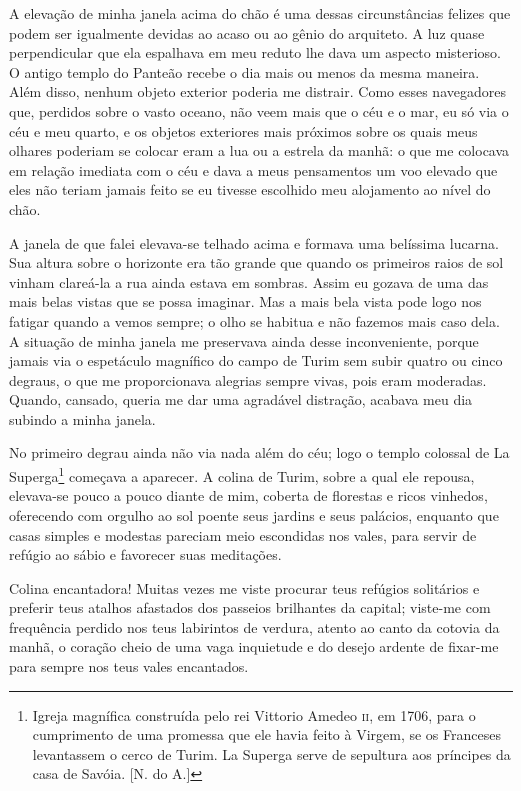  A elevação de minha janela acima do chão é uma dessas circunstâncias
felizes que podem ser igualmente devidas ao acaso ou ao gênio do
arquiteto. A luz quase perpendicular que ela espalhava em meu reduto
lhe dava um aspecto misterioso. O antigo templo do Panteão recebe o dia
mais ou menos da mesma maneira. Além disso, nenhum objeto exterior
poderia me distrair. Como esses navegadores que, perdidos sobre o vasto
oceano, não veem mais que o céu e o mar, eu só via o céu e meu quarto,
e os objetos exteriores mais próximos sobre os quais meus olhares
poderiam se colocar eram a lua ou a estrela da manhã: o que me colocava
em relação imediata com o céu e dava a meus pensamentos um voo elevado
que eles não teriam jamais feito se eu tivesse escolhido meu alojamento
ao nível do chão.

 A janela de que falei elevava-se telhado acima e formava uma belíssima
lucarna. Sua altura sobre o horizonte era tão grande que quando os
primeiros raios de sol vinham clareá-la a rua ainda estava em sombras.
Assim eu gozava de uma das mais belas vistas que se possa imaginar. Mas
a mais bela vista pode logo nos fatigar quando a vemos sempre; o olho
se habitua e não fazemos mais caso dela. A situação de minha janela me
preservava ainda desse inconveniente, porque jamais via o espetáculo
magnífico do campo de Turim sem subir quatro ou cinco degraus, o que me
proporcionava alegrias sempre vivas, pois eram moderadas. Quando,
cansado, queria me dar uma agradável distração, acabava meu dia subindo
a minha janela.

 No primeiro degrau ainda não via nada além do céu; logo o templo
colossal de La Superga\footnote{ Igreja magnífica construída pelo rei
Vittorio Amedeo \textsc{ii}, em 1706, para o cumprimento de uma promessa que ele
havia feito à Virgem, se os Franceses levantassem o cerco de Turim. La
Superga serve de sepultura aos príncipes da casa de Savóia. [N. do A.]}
começava a aparecer. A colina de Turim, sobre a qual ele repousa,
elevava-se pouco a pouco diante de mim, coberta de florestas e ricos
vinhedos, oferecendo com orgulho ao sol poente seus jardins e seus
palácios, enquanto que casas simples e modestas pareciam meio
escondidas nos vales, para servir de refúgio ao sábio e favorecer suas
meditações.

 Colina encantadora! Muitas vezes me viste procurar teus refúgios
solitários e preferir teus atalhos afastados dos passeios brilhantes da
capital; viste-me com frequência perdido nos teus labirintos de
verdura, atento ao canto da cotovia da manhã, o coração cheio de uma
vaga inquietude e do desejo ardente de fixar-me para sempre nos teus
vales encantados. 

